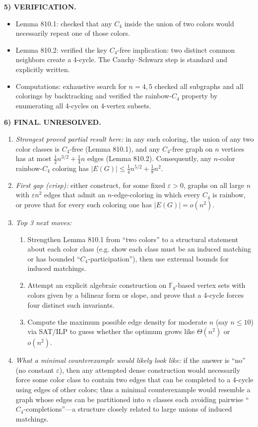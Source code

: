 \medskip
\noindent\textbf{5) VERIFICATION.}

\begin{itemize}
\item Lemma 810.1: checked that any $C_4$ inside the union of two colors would necessarily repeat one of those colors.
\item Lemma 810.2: verified the key $C_4$-free implication: two distinct common neighbors create a 4-cycle. The Cauchy--Schwarz step is standard and explicitly written.
\item Computations: exhaustive search for $n=4,5$ checked all subgraphs and all colorings by backtracking and verified the rainbow-$C_4$ property by enumerating all 4-cycles on 4-vertex subsets.
\end{itemize}

\medskip
\noindent\textbf{6) FINAL.} \textbf{UNRESOLVED.}

\begin{enumerate}
\item[(i)] \emph{Strongest proved partial result here:} in any such coloring, the union of any two color classes is $C_4$-free (Lemma 810.1), and any $C_4$-free graph on $n$ vertices has at most $\frac12 n^{3/2}+\frac14 n$ edges (Lemma 810.2). Consequently, any $n$-color rainbow-$C_4$ coloring has $|E(G)|\le \frac14 n^{5/2}+\frac18 n^2$.
\item[(ii)] \emph{First gap (crisp):} either construct, for some fixed $\varepsilon>0$, graphs on all large $n$ with $\varepsilon n^2$ edges that admit an $n$-edge-coloring in which every $C_4$ is rainbow, or prove that for every such coloring one has $|E(G)|=o(n^2)$.
\item[(iii)] \emph{Top 3 next moves:}
  \begin{enumerate}
  \item Strengthen Lemma 810.1 from ``two colors'' to a structural statement about each color class (e.g. show each class must be an induced matching or has bounded ``$C_4$-participation''), then use extremal bounds for induced matchings.
  \item Attempt an explicit algebraic construction on $\mathbb{F}_q$-based vertex sets with colors given by a bilinear form or slope, and prove that a 4-cycle forces four distinct such invariants.
  \item Compute the maximum possible edge density for moderate $n$ (say $n\le 10$) via SAT/ILP to guess whether the optimum grows like $\Theta(n^2)$ or $o(n^2)$.
  \end{enumerate}
\item[(iv)] \emph{What a minimal counterexample would likely look like:} if the answer is ``no'' (no constant $\varepsilon$), then any attempted dense construction would necessarily force some color class to contain two edges that can be completed to a 4-cycle using edges of other colors; thus a minimal counterexample would resemble a graph whose edges can be partitioned into $n$ classes each avoiding pairwise ``$C_4$-completions''---a structure closely related to large unions of induced matchings.
\end{enumerate}



